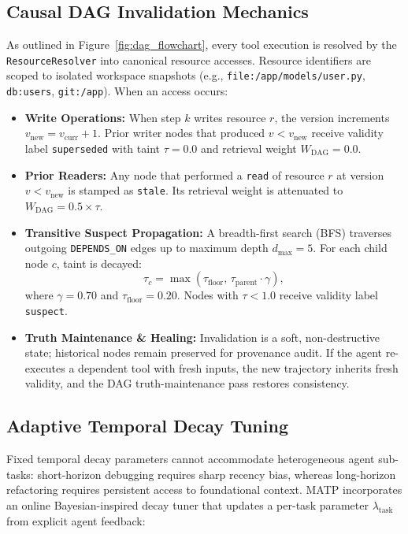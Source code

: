 \documentclass[10pt,journal,compsoc]{IEEEtran}
\begin{document}
\subsection{Causal DAG Invalidation Mechanics}
As outlined in Figure~\ref{fig:dag_flowchart}, every tool execution is resolved by the \texttt{ResourceResolver} into canonical resource accesses. Resource identifiers are scoped to isolated workspace snapshots (e.g., \texttt{file:/app/models/user.py}, \texttt{db:users}, \texttt{git:/app}). When an access occurs:
\begin{itemize}
    \item \textbf{Write Operations:} When step $k$ writes resource $r$, the version increments $v_{\text{new}} = v_{\text{curr}} + 1$. Prior writer nodes that produced $v < v_{\text{new}}$ receive validity label \texttt{superseded} with taint $\tau = 0.0$ and retrieval weight $W_{\text{DAG}} = 0.0$.
    \item \textbf{Prior Readers:} Any node that performed a \texttt{read} of resource $r$ at version $v < v_{\text{new}}$ is stamped as \texttt{stale}. Its retrieval weight is attenuated to $W_{\text{DAG}} = 0.5 \times \tau$.
    \item \textbf{Transitive Suspect Propagation:} A breadth-first search (BFS) traverses outgoing \texttt{DEPENDS\_ON} edges up to maximum depth $d_{\text{max}} = 5$. For each child node $c$, taint is decayed:
    \begin{equation}
    \tau_c = \max\left(\tau_{\text{floor}},\, \tau_{\text{parent}} \cdot \gamma\right),
    \end{equation}
    where $\gamma = 0.70$ and $\tau_{\text{floor}} = 0.20$. Nodes with $\tau < 1.0$ receive validity label \texttt{suspect}.
    \item \textbf{Truth Maintenance \& Healing:} Invalidation is a soft, non-destructive state; historical nodes remain preserved for provenance audit. If the agent re-executes a dependent tool with fresh inputs, the new trajectory inherits fresh validity, and the DAG truth-maintenance pass restores consistency.
\end{itemize}

\subsection{Adaptive Temporal Decay Tuning}
Fixed temporal decay parameters cannot accommodate heterogeneous agent sub-tasks: short-horizon debugging requires sharp recency bias, whereas long-horizon refactoring requires persistent access to foundational context. MATP incorporates an online Bayesian-inspired decay tuner that updates a per-task parameter $\lambda_{\text{task}}$ from explicit agent feedback:
\end{document}
